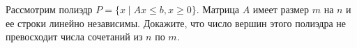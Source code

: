 Рассмотрим полиэдр $P = \{x \mid Ax \le b, x \ge 0\}$. Матрица $A$ имеет размер $m$ на $n$ и ее строки линейно
независимы. Докажите, что число вершин этого полиэдра не превосходит числа сочетаний из $n$ по $m$.
